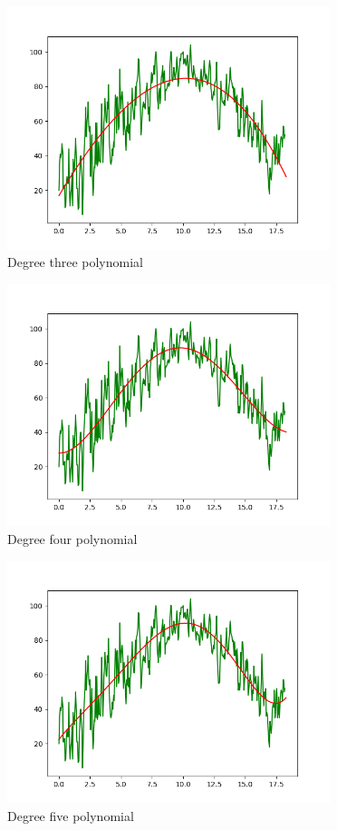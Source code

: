 \documentclass{article}
\begin{document}
\begin{figure}[H]
    \centering
    \includegraphics[height=200pt]{3poly_270.png}
    \caption{Degree three polynomial}
\end{figure}
\begin{figure}[H]
    \centering
    \includegraphics[height=200pt]{4poly_270.png}
    \caption{Degree four polynomial}
\end{figure}
\begin{figure}[H]
    \centering
    \includegraphics[height=200pt]{5poly_270.png}
    \caption{Degree five polynomial}
\end{figure}
\end{document}
